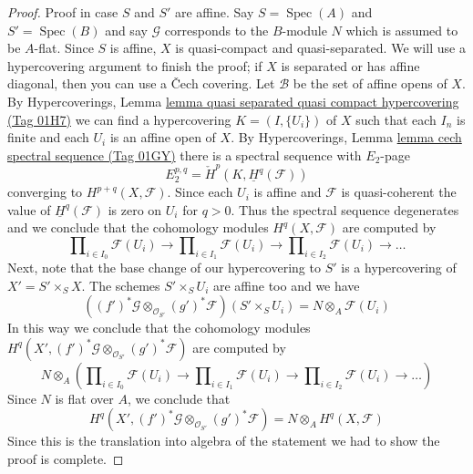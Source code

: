 \documentclass{amsart}
\theoremstyle{plain}
\theoremstyle{definition}
\theoremstyle{remark}
\numberwithin{equation}{subsection}
\def\Spec{\mathop{\mathrm{Spec}}}
\begin{document}
\begin{proof}
\medskip\noindent
Proof in case $S$ and $S'$ are affine. Say $S = \Spec(A)$ and $S' = \Spec(B)$
and say $\mathcal{G}$ corresponds to the $B$-module $N$ which is assumed to be
$A$-flat. Since $S$ is affine, $X$ is quasi-compact and quasi-separated.
We will use a hypercovering argument to finish the proof; if $X$ is separated
or has affine diagonal, then you can use a {\v C}ech covering.
Let $\mathcal{B}$ be the set of affine opens of $X$. By
Hypercoverings,
Lemma \href{https://stacks.math.columbia.edu/tag/01H7}{lemma quasi separated quasi compact hypercovering (Tag 01H7)}
we can find a hypercovering $K = (I, \{U_i\})$ of $X$ such that each
$I_n$ is finite and each $U_i$ is an affine open of $X$. By
Hypercoverings, Lemma \href{https://stacks.math.columbia.edu/tag/01GY}{lemma cech spectral sequence (Tag 01GY)}
there is a spectral sequence with $E_2$-page
$$
E_2^{p, q} = \check{H}^p(K, \underline{H}^q(\mathcal{F}))
$$
converging to $H^{p + q}(X, \mathcal{F})$. Since each $U_i$ is affine
and $\mathcal{F}$ is quasi-coherent the value of
$\underline{H}^q(\mathcal{F})$ is zero on $U_i$ for $q > 0$. Thus the
spectral sequence degenerates and we conclude that the cohomology
modules $H^q(X, \mathcal{F})$ are computed by
$$
\prod\nolimits_{i \in I_0} \mathcal{F}(U_i)
\to
\prod\nolimits_{i \in I_1} \mathcal{F}(U_i)
\to
\prod\nolimits_{i \in I_2} \mathcal{F}(U_i)
\to \ldots
$$
Next, note that the base change of our hypercovering to
$S'$ is a hypercovering of $X' = S' \times_S X$.
The schemes $S' \times_S U_i$ are affine too
and we have
$$
\left((f')^*\mathcal{G} \otimes_{\mathcal{O}_{S'}} (g')^*\mathcal{F}\right)
(S' \times_S U_i) =
N \otimes_A \mathcal{F}(U_i)
$$
In this way we conclude that the cohomology modules
$H^q(X', (f')^*\mathcal{G} \otimes_{\mathcal{O}_{S'}} (g')^*\mathcal{F})$
are computed by
$$
N \otimes_A \left(
\prod\nolimits_{i \in I_0} \mathcal{F}(U_i)
\to
\prod\nolimits_{i \in I_1} \mathcal{F}(U_i)
\to
\prod\nolimits_{i \in I_2} \mathcal{F}(U_i)
\to \ldots
\right)
$$
Since $N$ is flat over $A$, we conclude that
$$
H^q(X', (f')^*\mathcal{G} \otimes_{\mathcal{O}_{S'}} (g')^*\mathcal{F})
=
N \otimes_A H^q(X, \mathcal{F})
$$
Since this is the translation into algebra of the statement
we had to show the proof is complete.
\end{proof}
\end{document}
